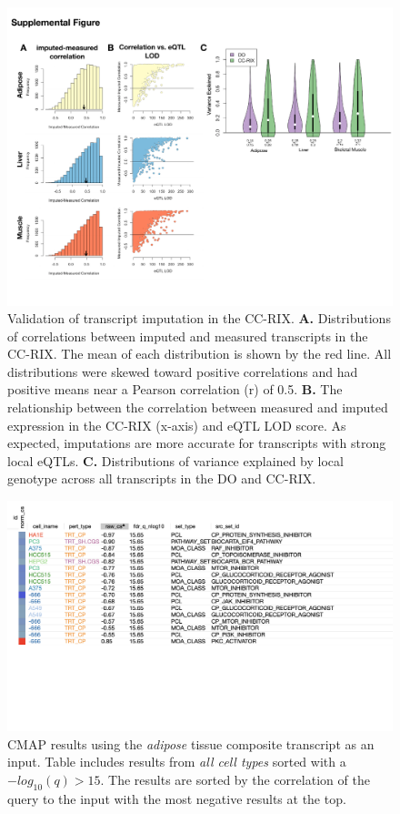 \documentclass[
]{article}
\begin{document}
\begin{figure}[ht!]
\includegraphics[width=\textwidth]{Figures/Supp_Fig_CC-RIX_Imputation.pdf} 
\caption{Validation of transcript imputation in the CC-RIX. \textbf{A.} 
Distributions of correlations between imputed and measured transcripts 
in the CC-RIX. The mean of each distribution is shown by the red line. 
All distributions were skewed toward positive correlations and had
 positive means near a Pearson correlation (r) of 0.5. \textbf{B.} 
 The relationship between the correlation between measured and 
 imputed expression in the CC-RIX (x-axis) and eQTL LOD score. As 
 expected, imputations are more accurate for transcripts with strong 
 local eQTLs. \textbf{C.} Distributions of variance explained by local 
 genotype across all transcripts in the DO and CC-RIX. 
}
\label{fig:cc_imputation}
\end{figure}

\begin{figure}[ht!]
\includegraphics[width=\textwidth]{Figures/Supp_Fig_Adipose_all_cell_types.png} 
\caption{CMAP results using the \textit{adipose} tissue composite transcript as 
an input. Table includes results from \textit{all cell types} sorted with a 
$-log_{10}(q) > 15$. The results are sorted by the correlation of the 
query to the input with the most negative results at the top.
}
\label{fig:clue_adipose_all}
\end{figure}
\end{document}

